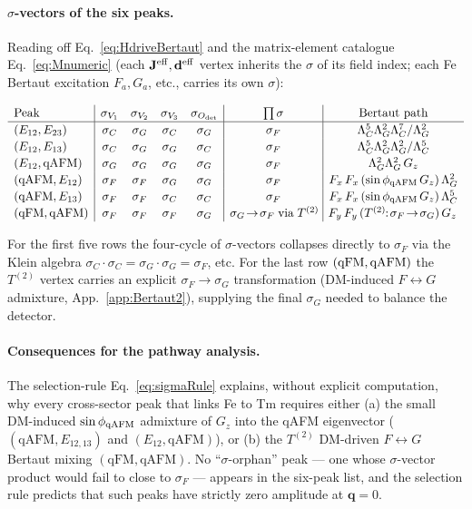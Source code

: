 \documentclass[reprint,amsmath,amssymb,aps,prb,longbibliography]{revtex4-2}
\newcommand{\Jeff}{\mathbf{J}^{\rm eff}}
\newcommand{\deff}{\mathbf{d}^{\rm eff}}
\begin{document}
\paragraph{$\sigma$-vectors of the six peaks.}
Reading off Eq.~\eqref{eq:HdriveBertaut} and the matrix-element
catalogue Eq.~\eqref{eq:Mnumeric} (each $\Jeff,\deff$ vertex inherits
the $\sigma$ of its field index; each Fe Bertaut excitation
$F_a, G_a$, etc., carries its own $\sigma$):
\begin{widetext}
\begin{equation}
\renewcommand{\arraystretch}{1.15}
\begin{array}{l|cccc|c|c}
\text{Peak} & \sigma_{V_1} & \sigma_{V_2} & \sigma_{V_3} & \sigma_{O_{\rm det}} & \prod\sigma & \text{Bertaut path}\\
\hline
(E_{12},E_{23}) & \sigma_C & \sigma_G & \sigma_C & \sigma_G & \sigma_F & \Lambda^5_C\Lambda^2_G\Lambda^7_C/\Lambda^2_G \\
(E_{12},E_{13}) & \sigma_C & \sigma_G & \sigma_G & \sigma_C & \sigma_F & \Lambda^5_C\Lambda^2_G\Lambda^2_G/\Lambda^5_C\\
(E_{12},\mathrm{qAFM}) & \sigma_G & \sigma_G & \sigma_G & \sigma_G & \sigma_F & \Lambda^2_G\Lambda^2_G\,G_z \\
(\mathrm{qAFM},E_{12}) & \sigma_F & \sigma_F & \sigma_G & \sigma_G & \sigma_F & F_x\,F_x\,(\sin\phi_{\rm qAFM}\,G_z)\,\Lambda^2_G\\
(\mathrm{qAFM},E_{13}) & \sigma_F & \sigma_F & \sigma_C & \sigma_C & \sigma_F & F_x\,F_x\,(\sin\phi_{\rm qAFM}\,G_z)\,\Lambda^5_C\\
(\mathrm{qFM},\mathrm{qAFM}) & \sigma_F & \sigma_F & \sigma_F & \sigma_G & \sigma_G \!\to\!\sigma_F\;\text{via}\;T^{(2)}\!&\!F_y\,F_y\,(T^{(2)}\!\!:\!\sigma_F\!\to\!\sigma_G)\,G_z
\end{array}
\label{eq:peakSigmaTable}
\end{equation}
\end{widetext}
For the first five rows the four-cycle of $\sigma$-vectors collapses
directly to $\sigma_F$ via the Klein algebra
$\sigma_C\!\cdot\!\sigma_C=\sigma_G\!\cdot\!\sigma_G=\sigma_F$, etc. For
the last row $({\rm qFM},{\rm qAFM})$ the $T^{(2)}$ vertex carries an
explicit $\sigma_F\!\to\!\sigma_G$ transformation (DM-induced
$F\leftrightarrow G$ admixture, App.~\ref{app:Bertaut2}), supplying the
final $\sigma_G$ needed to balance the detector.

\paragraph{Consequences for the pathway analysis.} The
selection-rule Eq.~\eqref{eq:sigmaRule} explains, without explicit
computation, why every cross-sector peak that links Fe to Tm requires
either (a) the small DM-induced
$\sin\phi_{\rm qAFM}$ admixture of $G_z$ into the qAFM eigenvector
($(\mathrm{qAFM},E_{12,13})$ and $(E_{12},\mathrm{qAFM})$), or (b) the
$T^{(2)}$ DM-driven $F\leftrightarrow G$ Bertaut mixing
$(\mathrm{qFM},\mathrm{qAFM})$. No ``$\sigma$-orphan'' peak --- one whose
$\sigma$-vector product would fail to close to $\sigma_F$ --- appears in
the six-peak list, and the
selection rule predicts that such peaks have strictly zero amplitude
at $\mathbf q=0$.
\end{document}
